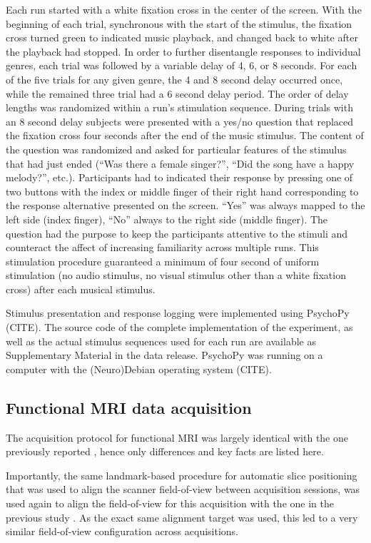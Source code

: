 Each run started with a white fixation cross in the center of the screen. With
the beginning of each trial, synchronous with the start of the stimulus, the
fixation cross turned green to indicated music playback, and changed back to
white after the playback had stopped.  In order to further disentangle
responses to individual genres, each trial was followed by a variable delay of
4, 6, or 8 seconds. For each of the five trials for any given genre, the 4 and
8 second delay occurred once, while the remained three trial had a 6 second
delay period. The order of delay lengths was randomized within a run's
stimulation sequence. During trials with an 8 second delay subjects were
presented with a yes/no question that replaced the fixation cross four seconds
after the end of the music stimulus. The content of the question was randomized
and asked for particular features of the stimulus that had just ended (``Was
there a female singer?'', ``Did the song have a happy melody?'', etc.).
Participants had to indicated their response by pressing one of two buttons
with the index or middle finger of their right hand corresponding to the
response alternative presented on the screen. ``Yes'' was always mapped to the
left side (index finger), ``No'' always to the right side (middle finger).  The
question had the purpose to keep the participants attentive to the stimuli and
counteract the affect of increasing familiarity across multiple runs.  This
stimulation procedure guaranteed a minimum of four second of uniform
stimulation (no audio stimulus, no visual stimulus other than a white fixation
cross) after each musical stimulus.

Stimulus presentation and response logging were implemented using PsychoPy
(CITE).  The source code of the complete implementation of the experiment, as
well as the actual stimulus sequences used for each run are available as
Supplementary Material in the data release. PsychoPy was running on a computer
with the (Neuro)Debian operating system (CITE).

\subsection*{Functional MRI data acquisition}

The acquisition protocol for functional MRI was largely identical with the one
previously reported \cite{Hanke_2014}, hence only differences and key facts are
listed here.

Importantly, the same landmark-based procedure for automatic slice positioning
that was used to align the scanner field-of-view between acquisition sessions,
was used again to align the field-of-view for this acquisition with the one in
the previous study \cite{Hanke_2014}. As the exact same alignment target was
used, this led to a very similar field-of-view configuration across
acquisitions.

